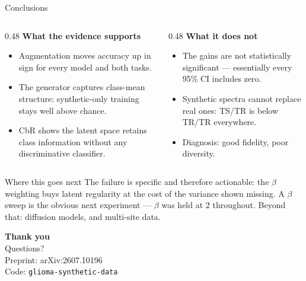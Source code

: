 \documentclass[aspectratio=169, 11pt]{beamer}
\begin{document}
\begin{frame}{Conclusions}
  \vspace{0.4em}
  \begin{columns}[T]
    \begin{column}{0.48\textwidth}
      \textbf{\color{accent}What the evidence supports}
      \begin{itemize}\setlength\itemsep{0.4em}\small
        \item Augmentation moves accuracy \alert{up in sign} for every model and
              both tasks.
        \item The generator captures class-mean structure: synthetic-only
              training stays well above chance.
        \item CbR shows the latent space retains class information without any
              discriminative classifier.
      \end{itemize}
    \end{column}
    \begin{column}{0.48\textwidth}
      \textbf{\color{accent}What it does not}
      \begin{itemize}\setlength\itemsep{0.4em}\small
        \item The gains are \alert{not statistically significant} --- essentially
              every 95\% CI includes zero.
        \item Synthetic spectra \alert{cannot replace} real ones: TS/TR is below
              TR/TR everywhere.
        \item Diagnosis: good fidelity, \alert{poor diversity}.
      \end{itemize}
    \end{column}
  \end{columns}
  \vspace{1.0em}
  \begin{block}{\small Where this goes next}
    \small
    The failure is specific and therefore actionable: the $\beta$ weighting buys
    latent regularity at the cost of the variance shown missing. A $\beta$ sweep
    is the obvious next experiment --- $\beta$ was held at $2$ throughout.
    Beyond that: diffusion models, and multi-site data.
  \end{block}
\end{frame}

{
\begin{frame}[plain]
  \vfill
  \begin{center}
    {\LARGE\bfseries\color{accent} Thank you}\\[1.2em]
    {\large Questions?}\\[2.0em]
    \small\color{gray}
    Preprint: arXiv:2607.10196\\
    Code: \texttt{glioma-synthetic-data}
  \end{center}
  \vfill
\end{frame}
}
\end{document}
